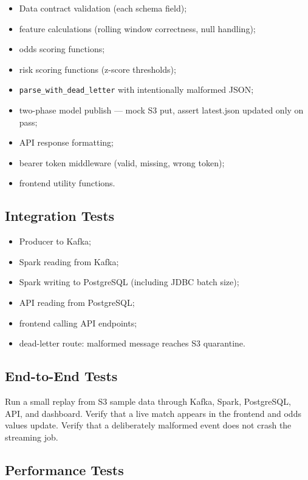 \documentclass[11pt,a4paper]{article}
\begin{document}
\begin{itemize}[nosep]
  \item Data contract validation (each schema field);
  \item feature calculations (rolling window correctness, null handling);
  \item odds scoring functions;
  \item risk scoring functions (z-score thresholds);
  \item \texttt{parse\_with\_dead\_letter} with intentionally malformed JSON;
  \item two-phase model publish --- mock S3 put, assert latest.json updated only on pass;
  \item API response formatting;
  \item bearer token middleware (valid, missing, wrong token);
  \item frontend utility functions.
\end{itemize}

\subsection{Integration Tests}

\begin{itemize}[nosep]
  \item Producer to Kafka;
  \item Spark reading from Kafka;
  \item Spark writing to PostgreSQL (including JDBC batch size);
  \item API reading from PostgreSQL;
  \item frontend calling API endpoints;
  \item dead-letter route: malformed message reaches S3 quarantine.
\end{itemize}

\subsection{End-to-End Tests}

Run a small replay from S3 sample data through Kafka, Spark, PostgreSQL, API, and dashboard.
Verify that a live match appears in the frontend and odds values update. Verify that a
deliberately malformed event does not crash the streaming job.

\subsection{Performance Tests}
\end{document}
